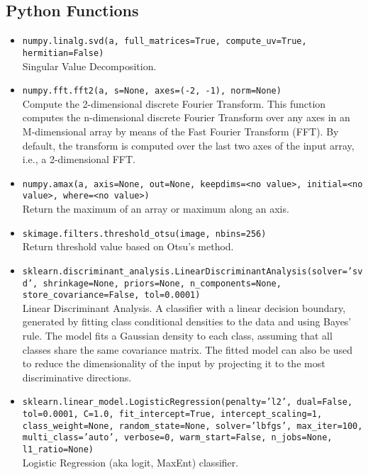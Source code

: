 \documentclass{article}
\begin{document}
\begin{appendices}

\section{Python Functions}
\begin{itemize}
    \item \texttt{numpy.linalg.svd(a, full\_matrices=True, compute\_uv=True, hermitian=False)}\\ 
    Singular Value Decomposition.
    \item \texttt{numpy.fft.fft2(a, s=None, axes=(-2, -1), norm=None)}\\ Compute the 2-dimensional discrete Fourier Transform.
    This function computes the n-dimensional discrete Fourier Transform over any axes in an M-dimensional array by means of the Fast Fourier Transform (FFT). By default, the transform is computed over the last two axes of the input array, i.e., a 2-dimensional FFT.
    \item \texttt{numpy.amax(a, axis=None, out=None, keepdims=<no value>, initial=<no value>, where=<no value>)} \\
    Return the maximum of an array or maximum along an axis.
    \item \texttt{skimage.filters.threshold\_otsu(image, nbins=256)}\\ Return threshold value based on Otsu’s method.
    \item \texttt{sklearn.discriminant\_analysis.LinearDiscriminantAnalysis(solver='svd', shrinkage=None, priors=None, n\_components=None, store\_covariance=False, tol=0.0001)}\\
    Linear Discriminant Analysis. A classifier with a linear decision boundary, generated by fitting class conditional densities to the data and using Bayes’ rule. The model fits a Gaussian density to each class, assuming that all classes share the same covariance matrix. The fitted model can also be used to reduce the dimensionality of the input by projecting it to the most discriminative directions.
    \item \texttt{sklearn.linear\_model.LogisticRegression(penalty='l2', dual=False, tol=0.0001, C=1.0, fit\_intercept=True, intercept\_scaling=1, class\_weight=None, random\_state=None, solver='lbfgs', max\_iter=100, multi\_class='auto', verbose=0, warm\_start=False, n\_jobs=None, l1\_ratio=None)}\\
    Logistic Regression (aka logit, MaxEnt) classifier.

\end{itemize}
\end{appendices}
\end{document}
